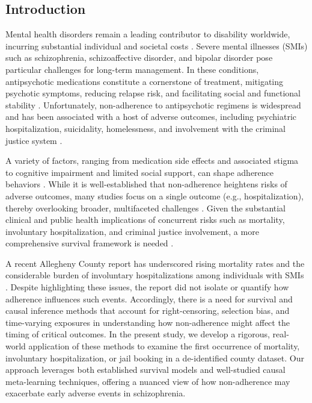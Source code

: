 \subsection{Introduction}
\label{ch03:sec:intro}
Mental health disorders remain a leading contributor to disability worldwide, incurring substantial individual and societal costs \citep{whiteford2013global, rehm2019global, gbd2022global}. 
Severe mental illnesses (SMIs) such as schizophrenia, schizoaffective disorder, and bipolar disorder pose particular challenges for long-term management. 
In these conditions, antipsychotic medications constitute a cornerstone of treatment, mitigating psychotic symptoms, reducing relapse risk, and facilitating social and functional stability \citep{yatham2018canadian, keepers2020american, leucht2012antipsychotic, tiihonen2017real}. 
Unfortunately, non-adherence to antipsychotic regimens is widespread and has been associated with a host of adverse outcomes, including psychiatric hospitalization, suicidality, homelessness, and involvement with the criminal justice system \citep{ascher2006medication, velligan2009expert, velligan2017psychiatric, correll2018comparison}.

A variety of factors, ranging from medication side effects and associated stigma to cognitive impairment and limited social support, can shape adherence behaviors \citep{kane2016comprehensive, semahegn2020psychotropic}. 
While it is well-established that non-adherence heightens risks of adverse outcomes, many studies focus on a single outcome (e.g., hospitalization), thereby overlooking broader, multifaceted challenges \citep{walter2019multiple, mok2024multiple}.
Given the substantial clinical and public health implications of concurrent risks such as mortality, involuntary hospitalization, and criminal justice involvement, a more comprehensive survival framework is needed \citep{chen2022influencing}.

A recent Allegheny County report has underscored rising mortality rates and the considerable burden of involuntary hospitalizations among individuals with SMIs \citep{welle2023involuntary}. 
Despite highlighting these issues, the report did not isolate or quantify how adherence influences such events.
Accordingly, there is a need for survival and causal inference methods that account for right-censoring, selection bias, and time-varying exposures in understanding how non-adherence might affect the timing of critical outcomes.
In the present study, we develop a rigorous, real-world application of these methods to examine the first occurrence of mortality, involuntary hospitalization, or jail booking in a de-identified county dataset.
Our approach leverages both established survival models and well-studied causal meta-learning techniques, offering a nuanced view of how non-adherence may exacerbate early adverse events in schizophrenia.

